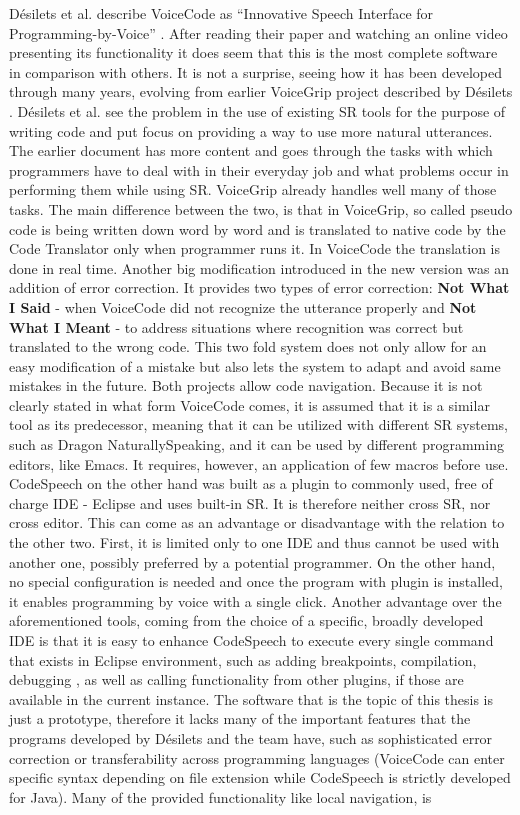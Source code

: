 Désilets et al. describe VoiceCode as ``Innovative Speech Interface for Programming-by-Voice'' \cite{Desilets2006}. After reading their paper and watching an online video  presenting its functionality \cite{VoiceCode2007} it does seem that this is the most complete software in comparison with others. It is not a surprise, seeing how it has been developed through many years, evolving from earlier VoiceGrip project described by Désilets \cite{Desilets2001}. Désilets et al. see the problem in the use of existing SR tools for the purpose of writing code and put focus on providing a way to use more natural utterances. The earlier document has more content and goes through the tasks with which programmers have to deal with in their everyday job and what problems occur in performing them while using SR. VoiceGrip already handles well many of those tasks. The main difference between the two, is that in VoiceGrip, so called pseudo code is being written down word by word and is translated to native code by the Code Translator only when programmer runs it. In VoiceCode the translation is done in real time. Another big modification introduced in the new version was an addition of error correction. It provides two types of error correction: \textbf{Not What I Said}  - when VoiceCode did not recognize the utterance properly and \textbf{Not What I Meant} - to address situations where recognition was correct but translated to the wrong code. This two fold system does not only allow for an easy modification of a mistake but also lets the system to adapt and avoid same mistakes in the future. Both projects allow code navigation. Because it is not clearly stated in what form VoiceCode comes, it is assumed that it is a similar tool as its predecessor, meaning that it can be utilized with different SR systems, such as Dragon NaturallySpeaking, and it can be used by different programming editors, like \eg Emacs. It requires, however, an application of few macros before use. CodeSpeech on the other hand was built as a plugin to commonly used, free of charge IDE - Eclipse and uses built-in SR. It is therefore neither cross SR, nor cross editor. This can come as an advantage or disadvantage with the relation to the other two. First, it is limited only to one IDE and thus cannot be used with another one, possibly preferred by a potential programmer. On the other hand, no special configuration is needed and once the program with plugin is installed, it enables programming by voice with a single click. Another advantage over the aforementioned tools, coming from the choice of a specific, broadly developed IDE is that it is easy to enhance CodeSpeech to execute every single command that exists in Eclipse environment, such as adding breakpoints, compilation, debugging \etc, as well as calling functionality from other plugins, if those are available in the current instance. The software that is the topic of this thesis is just a prototype, therefore it lacks many of the important features that the programs developed by Désilets and the team have, such as sophisticated error correction or transferability across programming languages (VoiceCode can enter specific syntax depending on file extension while CodeSpeech is strictly developed for Java). Many of the provided functionality like local navigation, is 